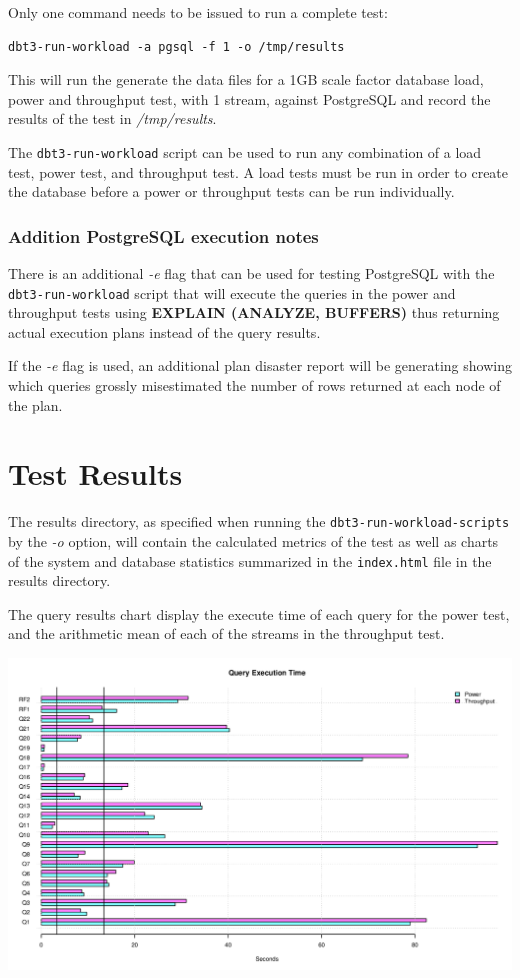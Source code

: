 \documentclass{article}
\begin{document}
Only one command needs to be issued to run a complete test:
\lstset{language=sh}
\begin{lstlisting}
dbt3-run-workload -a pgsql -f 1 -o /tmp/results
\end{lstlisting}

This will run the generate the data files for a 1GB scale factor database load,
power and throughput test, with 1 stream, against PostgreSQL and record the
results of the test in \textit{/tmp/results}.

The \texttt{dbt3-run-workload} script can be used to run any combination of a
load test, power test, and throughput test.  A load tests must be run in order
to create the database before a power or throughput tests can be run
individually.

\subsubsection{Addition PostgreSQL execution notes}

There is an additional \textit{-e} flag that can be used for testing PostgreSQL
with the \texttt{dbt3-run-workload} script that will execute the queries in the
power and throughput tests using \textbf{EXPLAIN (ANALYZE, BUFFERS)} thus
returning actual execution plans instead of the query results.

If the \textit{-e} flag is used, an additional plan disaster report will be
generating showing which queries grossly misestimated the number of rows
returned at each node of the plan.

\section{Test Results}

The results directory, as specified when running the
\texttt{dbt3-run-workload-scripts} by the \textit{-o} option, will contain the
calculated metrics of the test as well as charts of the system and database
statistics summarized in the \texttt{index.html} file in the results directory.

The query results chart display the execute time of each query for the power
test, and the arithmetic mean of each of the streams in the throughput test.

\begin{center}
  \includegraphics[scale=0.5]{q_time.png}
\end{center}
\end{document}
